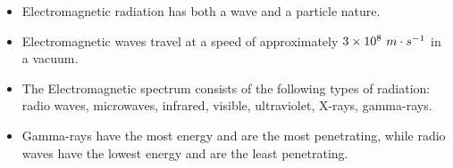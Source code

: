 \noindent
            \begin{itemize}[noitemsep] 
            \label{m38779*uid30}\item Electromagnetic radiation has both a wave and a particle nature.
\label{m38779*uid31}\item Electromagnetic waves travel at a speed of approximately $3\ensuremath{\times}{10}^{8}\phantom{\rule{3.33333pt}{0ex}}m\ensuremath{\cdot}{s}^{-1}$ in a vacuum.
\label{m38779*uid32}\item The Electromagnetic spectrum consists of the following types of radiation: radio waves, microwaves, infrared, visible, ultraviolet, X-rays, gamma-rays.
\label{m38779*uid33}\item Gamma-rays have the most energy and are the most penetrating, while radio waves have the lowest energy and are the least penetrating.
\end{itemize}


